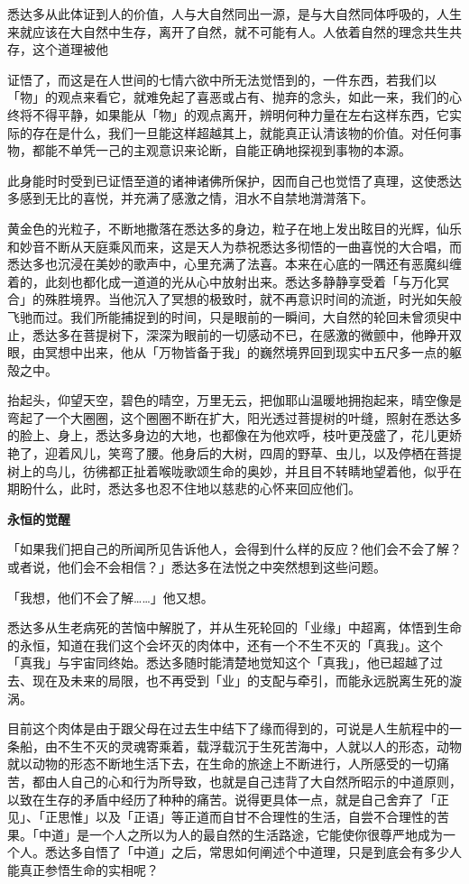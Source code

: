 \documentclass[twoside,openany]{book}
\newcommand{\mt}[1]{\textbullet \textbf{#1}}
\begin{document}
悉达多从此体证到人的价值，人与大自然同出一源，是与大自然同体呼吸的，人生来就应该在大自然中生存，离开了自然，就不可能有人。人依着自然的理念共生共存，这个道理被他





证悟了，而这是在人世间的七情六欲中所无法觉悟到的，一件东西，若我们以「物」的观点来看它，就难免起了喜恶或占有、抛弃的念头，如此一来，我们的心终将不得平静，如果能从「物」的观点离开，辨明何种力量在左右这样东西，它实际的存在是什么，我们一旦能这样超越其上，就能真正认清该物的价值。对任何事物，都能不单凭一己的主观意识来论断，自能正确地探视到事物的本源。

此身能时时受到已证悟至道的诸神诸佛所保护，因而自己也觉悟了真理，这使悉达多感到无比的喜悦，并充满了感激之情，泪水不自禁地潸潸落下。

黄金色的光粒子，不断地撒落在悉达多的身边，粒子在地上发出眩目的光辉，仙乐和妙音不断从天庭乘风而来，这是天人为恭祝悉达多彻悟的一曲喜悦的大合唱，而悉达多也沉浸在美妙的歌声中，心里充满了法喜。本来在心底的一隅还有恶魔纠缠着的，此刻也都化成一道道的光从心中放射出来。悉达多静静享受着「与万化冥合」的殊胜境界。当他沉入了冥想的极致时，就不再意识时间的流逝，时光如矢般飞驰而过。我们所能捕捉到的时间，只是眼前的一瞬间，大自然的轮回未曾须臾中止，悉达多在菩提树下，深深为眼前的一切感动不已，在感激的微颤中，他睁开双眼，由冥想中出来，他从「万物皆备于我」的巍然境界回到现实中五尺多一点的躯殻之中。

抬起头，仰望天空，碧色的晴空，万里无云，把伽耶山温暖地拥抱起来，晴空像是弯起了一个大圈圈，这个圈圈不断在扩大，阳光透过菩提树的叶缝，照射在悉达多的脸上、身上，悉达多身边的大地，也都像在为他欢呼，枝叶更茂盛了，花儿更娇艳了，迎着风儿，笑弯了腰。他身后的大树，四周的野草、虫儿，以及停栖在菩提树上的鸟儿，彷彿都正扯着喉咙歌颂生命的奥妙，并且目不转睛地望着他，似乎在期盼什么，此时，悉达多也忍不住地以慈悲的心怀来回应他们。

\mt{永恒的觉醒}

「如果我们把自己的所闻所见告诉他人，会得到什么样的反应？他们会不会了解？或者说，他们会不会相信？」悉达多在法悦之中突然想到这些问题。

「我想，他们不会了解……」他又想。

悉达多从生老病死的苦恼中解脱了，并从生死轮回的「业缘」中超离，体悟到生命的永恒，知道在我们这个会坏灭的肉体中，还有一个不生不灭的「真我」。这个「真我」与宇宙同终始。悉达多随时能清楚地觉知这个「真我」，他已超越了过去、现在及未来的局限，也不再受到「业」的支配与牵引，而能永远脱离生死的漩涡。

目前这个肉体是由于跟父母在过去生中结下了缘而得到的，可说是人生航程中的一条船，由不生不灭的灵魂寄乘着，载浮载沉于生死苦海中，人就以人的形态，动物就以动物的形态不断地生活下去，在生命的旅途上不断进行，人所感受的一切痛苦，都由人自己的心和行为所导致，也就是自己违背了大自然所昭示的中道原则，以致在生存的矛盾中经历了种种的痛苦。说得更具体一点，就是自己舍弃了「正见」、「正思惟」以及「正语」等正道而自甘不合理性的生活，自尝不合理性的苦果。「中道」是一个人之所以为人的最自然的生活路途，它能使你很尊严地成为一个人。悉达多自悟了「中道」之后，常思如何阐述个中道理，只是到底会有多少人能真正参悟生命的实相呢？
\end{document}
